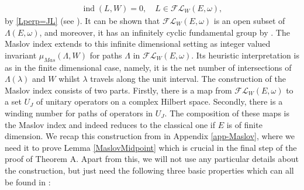 \documentclass[a4paper,10pt]{article}
\DeclareMathOperator{\ind}{ind}
\begin{document}
\begin{align}\label{ind=0Lagrangian}
\ind(L,W)=0,\quad L\in\mathcal{FL}_W(E,\omega),
\end{align}
by \eqref{Lperp=JL} (see \cite[(1.3)]{NicolaescuI}). It can be shown that $\mathcal{FL}_W(E,\omega)$ is an open subset of $\Lambda(E,\omega)$, and moreover, it has an infinitely cyclic fundamental group by \cite[Thm. 1.54]{Furutani}. The Maslov index extends to this infinite dimensional setting as integer valued invariant $\mu_{Mas}(\Lambda,W)$ for paths $\Lambda$ in $\mathcal{FL}_W(E,\omega)$. Its heuristic interpretation is as in the finite dimensional case, namely, it is the net number of intersections of $\Lambda(\lambda)$ and $W$ whilst $\lambda$ travels along the unit interval. The construction of the Maslov index consists of two parts. Firstly, there is a map from $\mathcal{FL}_W(E,\omega)$ to a set $U_J$ of unitary operators on a complex Hilbert space. Secondly, there is a winding number for paths of operators in $U_J$. The composition of these maps is the Maslov index and indeed reduces to the classical one if $E$ is of finite dimension. We recap this construction from \cite{Furutani} in Appendix \ref{app-Maslov}, where we need it to prove Lemma \ref{MaslovMidpoint} which is crucial in the final step of the proof of Theorem A. Apart from this, we will not use any particular details about the construction, but just need the following three basic properties which can all be found in \cite{Furutani}:
\end{document}
